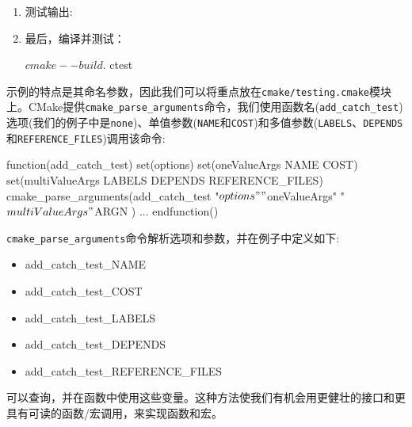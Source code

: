 \begin{enumerate}
\item 测试输出:


\item 最后，编译并测试：

\begin{codebox}[shell]
$ cmake --build .
$ ctest
\end{codebox}

\end{enumerate}


示例的特点是其命名参数，因此我们可以将重点放在\texttt{cmake/testing.cmake}模块上。CMake提供\texttt{cmake\_parse\_arguments}命令，我们使用函数名(\texttt{add\_catch\_test})选项(我们的例子中是\texttt{none})、单值参数(\texttt{NAME}和\texttt{COST})和多值参数(\texttt{LABELS}、\texttt{DEPENDS}和\texttt{REFERENCE\_FILES})调用该命令:

\begin{codebox}[cmake]
function(add_catch_test)
  set(options)
  set(oneValueArgs NAME COST)
  set(multiValueArgs LABELS DEPENDS REFERENCE_FILES)
  cmake_parse_arguments(add_catch_test
    "${options}"
    "${oneValueArgs}"
    "${multiValueArgs}"
    ${ARGN}
    )
...
endfunction()
\end{codebox}

\texttt{cmake\_parse\_arguments}命令解析选项和参数，并在例子中定义如下:

\begin{itemize}
\item add\_catch\_test\_NAME

\item add\_catch\_test\_COST

\item add\_catch\_test\_LABELS

\item add\_catch\_test\_DEPENDS

\item add\_catch\_test\_REFERENCE\_FILES

\end{itemize}

可以查询，并在函数中使用这些变量。这种方法使我们有机会用更健壮的接口和更具有可读的函数/宏调用，来实现函数和宏。

